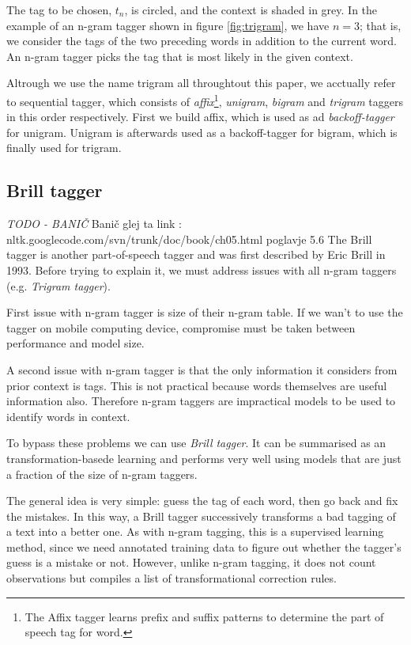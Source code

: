 \documentclass[11pt, conference, compsocconf]{IEEEtran}
\begin{document}
The tag to be chosen, $t_{n}$, is circled, and the context is shaded in grey.
In the example of an n-gram tagger shown in figure \ref{fig:trigram}, we have $n=3$; that is, we consider the tags of the two preceding words in addition to the current word.
An n-gram tagger picks the tag that is most likely in the given context.
\par
Altrough we use the name trigram all throughtout this paper, we acctually refer to sequential tagger, which consists of
\textit{affix}\footnote{The Affix tagger learns prefix and suffix patterns to determine the part of speech tag for word.}, \textit{unigram}, \textit{bigram} and \textit{trigram} taggers in this order respectively. First we build affix, which is used as ad \textit{backoff-tagger} for unigram. Unigram is afterwards used as a backoff-tagger for bigram, which is finally used for trigram.

\subsection{Brill tagger} %
\textit{TODO - BANIČ}
Banič glej ta link : nltk.googlecode.com/svn/trunk/doc/book/ch05.html
poglavje 5.6
The Brill tagger is another part-of-speech tagger and was first described by Eric Brill in 1993. Before trying to explain it, we must address issues with all n-gram taggers (e.g. \textit{Trigram tagger}).

First issue with n-gram tagger is size of their n-gram table. If we wan't to use the tagger on mobile computing device, compromise must be taken between performance and model size. 

A second issue with n-gram tagger is that the only information it considers from prior context is tags. This is not practical because words themselves are useful information also. Therefore n-gram taggers are impractical models to be used to identify words in context. 
  
To bypass these problems we can use \textit{Brill tagger}. It can be summarised as an transformation-basede learning and performs very well using models that are just a fraction of the size of n-gram taggers.

The general idea is very simple: guess the tag of each word, then go back and fix the mistakes. In this way, a Brill tagger successively transforms a bad tagging of a text into a better one. As with n-gram tagging, this is a supervised learning method, since we need annotated training data to figure out whether the tagger's guess is a mistake or not. However, unlike n-gram tagging, it does not count observations but compiles a list of transformational correction rules.
\end{document}
